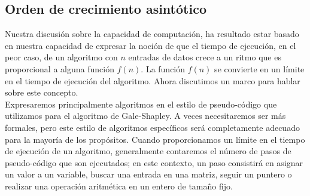 \documentclass[a4paper]{article}
\begin{document}
 \subsection{Orden de crecimiento asintótico}

Nuestra discusión sobre la capacidad de computación, ha resultado  estar basado en nuestra capacidad de expresar la noción de que el tiempo de ejecución, en el peor caso, de un algoritmo con $n$ entradas de datos crece a un ritmo que es proporcional a alguna función $f(n)$. La función $f(n)$ se convierte en un límite en el tiempo de ejecución del algoritmo. Ahora discutimos un marco para hablar sobre este concepto. \\

Expresaremos principalmente algoritmos en el estilo de pseudo-código que utilizamos para el algoritmo de Gale-Shapley. A veces necesitaremos ser más formales, pero este estilo de algoritmos específicos será completamente adecuado para la mayoría de los propósitos. Cuando proporcionamos un límite en el tiempo de ejecución de un algoritmo, generalmente contaremos el número de pasos de pseudo-código que son ejecutados; en este contexto, un paso consistirá en asignar un valor a un variable, buscar una entrada en una matriz, seguir un puntero o realizar una operación aritmética en un entero de tamaño fijo.\\
\end{document}
